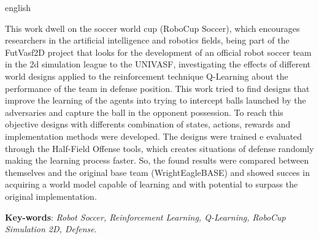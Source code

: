 \begin{resumo}[Abstract]
\begin{otherlanguage*}{english}

	This work dwell on the soccer world cup (RoboCup Soccer), which encourages
	researchers in the artificial intelligence and robotics fields, being part
	of the FutVasf2D project that looks for the development of an official robot
	soccer team in the 2d simulation league to the UNIVASF, investigating the
	effects of different world designs applied to the reinforcement technique
	Q-Learning about the performance of the team in defense position. This work
	tried to find designs that improve the learning of the agents into trying to
	intercept balls launched by the adversaries and capture the ball in the
	opponent possession. To reach this objective designs with differents
	combination of states, actions, rewards and implementation methods were
	developed. The designs were trained e evaluated through the Half-Field Offense tools, which
	creates situations of defense randomly making the learning process faster.
	So, the found results were compared between themselves and the original base
	team (WrightEagleBASE) and showed succes in acquiring a world model capable
	of learning and with potential to surpass the original implementation.
	
	\vspace{\onelineskip}

	\noindent
	\textbf{Key-words}: \textit{Robot Soccer, Reinforcement Learning, Q-Learning, RoboCup Simulation 2D, Defense}.

\end{otherlanguage*}
\end{resumo}


